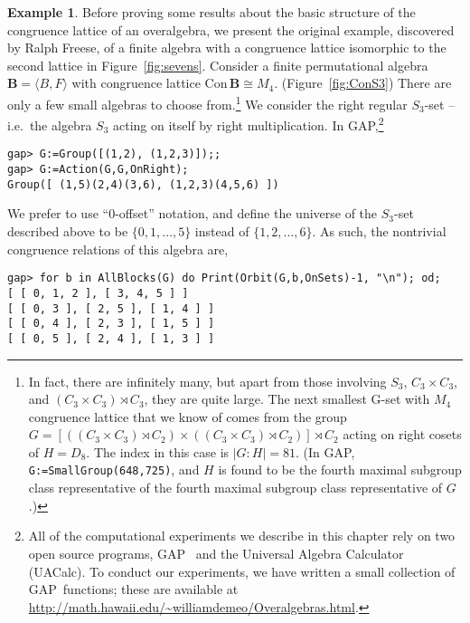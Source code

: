 \documentclass[cm,dissertation]{uhthesis}
\theoremstyle{plain}
\theoremstyle{definition}
\newtheorem{example}[theorem]{Example}
\theoremstyle{remark}
\numberwithin{theorem}{section}
\numberwithin{claim}{chapter}
\numberwithin{equation}{section}
\numberwithin{conjecture}{chapter}
\newcommand{\<}{\ensuremath{\langle}}
\renewcommand{\>}{\ensuremath{\rangle}}
\newcommand{\Con}{\ensuremath{\mathrm{Con\,}}}
\newcommand{\GAP}{\textsf{GAP}}
\newcommand{\uacalc}{\textsf{UACalc}}
\newcommand{\0}{\ensuremath{\mathbf{0}}}
\newcommand{\1}{\ensuremath{\mathbf{1}}}
\newcommand{\2}{\ensuremath{\mathbf{2}}}
\newcommand{\3}{\ensuremath{\mathbf{3}}}
\newcommand{\4}{\ensuremath{\mathbf{4}}}
\newcommand{\5}{\ensuremath{\mathbf{5}}}
\newcommand{\bB}{\ensuremath{\mathbf{B}}}
\begin{document}
\begin{example}
  \label{ex:3.1}  
  Before proving some results about the basic structure of the
  congruence lattice of an overalgebra, we 
  present the original example, discovered by 
%
Ralph Freese, of a finite algebra with
  a congruence lattice isomorphic to the second lattice in 
  Figure~\ref{fig:sevens}.
  Consider a finite permutational algebra $\bB = \<B, F\>$
  with congruence lattice $\Con\bB \cong M_4$. (Figure~\ref{fig:ConS3})
  There are only a few small algebras to choose 
  from.\footnote{In fact, there are
    infinitely many, but apart from those involving 
    $S_3$, $C_3 \times C_3$, and $(C_3 \times C_3) \rtimes C_3$, they are quite
    large.  The next smallest G-set with $M_4$
    congruence lattice that we know of comes from the group 
    $G = 
    [ 
      ( (C_3 \times C_3) \rtimes C_2 ) 
      \times 
      ( (C_3 \times C_3) \rtimes C_2 )
    ] \rtimes C_2$
    acting on right cosets of $H = D_8$.  
    The index in this case is $|G:H| = 81$.
    (In \GAP, {\tt G:=SmallGroup(648,725)}, 
    and $H$ is 
    found to be the fourth maximal subgroup class representative 
    of the fourth maximal subgroup class representative of $G$.)}
  We consider the right regular $S_3$-set -- i.e.~the algebra $S_3$ acting on
  itself by right multiplication.  In \GAP,\footnote{
    All of the computational experiments we describe in this chapter rely on
    two open source programs, \GAP~\cite{GAP4} and the Universal Algebra
    Calculator~\cite{uacalc} (\uacalc).  To conduct our experiments,
    we have written a small collection of \GAP\ functions; these are
    available at \url{http://math.hawaii.edu/~williamdemeo/Overalgebras.html}.
  }
  
  {\footnotesize
\begin{verbatim}
gap> G:=Group([(1,2), (1,2,3)]);; 
gap> G:=Action(G,G,OnRight);  
Group([ (1,5)(2,4)(3,6), (1,2,3)(4,5,6) ])
\end{verbatim}
  }

  We prefer to use ``0-offset'' notation, and 
  define the universe of the $S_3$-set described above to be $\{0, 1,\dots,
  5\}$ instead of $\{1, 2, \dots, 6\}$.  
  As such, the nontrivial congruence relations of this algebra are,

  {\footnotesize
\begin{verbatim}
gap> for b in AllBlocks(G) do Print(Orbit(G,b,OnSets)-1, "\n"); od;
[ [ 0, 1, 2 ], [ 3, 4, 5 ] ]
[ [ 0, 3 ], [ 2, 5 ], [ 1, 4 ] ]
[ [ 0, 4 ], [ 2, 3 ], [ 1, 5 ] ]
[ [ 0, 5 ], [ 2, 4 ], [ 1, 3 ] ]
\end{verbatim}
  }


\end{example}
\end{document}

